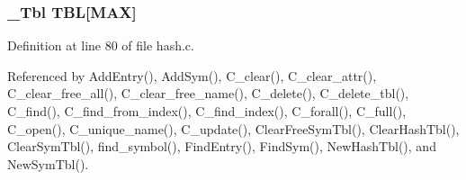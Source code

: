 \subsubsection{\setlength{\rightskip}{0pt plus 5cm}\bf{\_\-Tbl} \bf{TBL}[MAX]\hspace{0.3cm}{\tt  [static]}}\label{hash_8c_09d1102ef824c94746561bd930c87e48}




Definition at line 80 of file hash.c.

Referenced by Add\-Entry(), Add\-Sym(), C\_\-clear(), C\_\-clear\_\-attr(), C\_\-clear\_\-free\_\-all(), C\_\-clear\_\-free\_\-name(), C\_\-delete(), C\_\-delete\_\-tbl(), C\_\-find(), C\_\-find\_\-from\_\-index(), C\_\-find\_\-index(), C\_\-forall(), C\_\-full(), C\_\-open(), C\_\-unique\_\-name(), C\_\-update(), Clear\-Free\-Sym\-Tbl(), Clear\-Hash\-Tbl(), Clear\-Sym\-Tbl(), find\_\-symbol(), Find\-Entry(), Find\-Sym(), New\-Hash\-Tbl(), and New\-Sym\-Tbl().